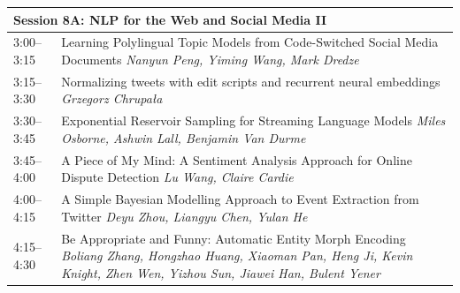 \documentclass{book}
\renewcommand{\large}{\fontsize{36}{40}\selectfont}
\begin{document}
\begin{tabular}{p{3in}p{16in}}
  \multicolumn{2}{l}{\bfseries\large Session 8A: NLP for the Web and Social Media II} \\\hline

    
    3:00--3:15
    &	Learning Polylingual Topic Models from Code-Switched Social Media Documents \newline 
    {\itshape Nanyun Peng, Yiming Wang, Mark Dredze} \\
    
    3:15--3:30
    &	Normalizing tweets with edit scripts and recurrent neural embeddings \newline 
    {\itshape Grzegorz Chrupała} \\
    
    3:30--3:45
    &	Exponential Reservoir Sampling for Streaming Language Models \newline 
    {\itshape Miles Osborne, Ashwin Lall, Benjamin Van Durme} \\
    
    3:45--4:00
    &	A Piece of My Mind: A Sentiment Analysis Approach for Online Dispute Detection \newline 
    {\itshape Lu Wang, Claire Cardie} \\
    
    4:00--4:15
    &	A Simple Bayesian Modelling Approach to Event Extraction from Twitter \newline 
    {\itshape Deyu Zhou, Liangyu Chen, Yulan He} \\
    
    4:15--4:30
    &	Be Appropriate and Funny: Automatic Entity Morph Encoding \newline 
    {\itshape Boliang Zhang, Hongzhao Huang, Xiaoman Pan, Heng Ji, Kevin Knight, Zhen Wen, Yizhou Sun, Jiawei Han, Bulent Yener} \\
    
\end{tabular}
\end{document}
